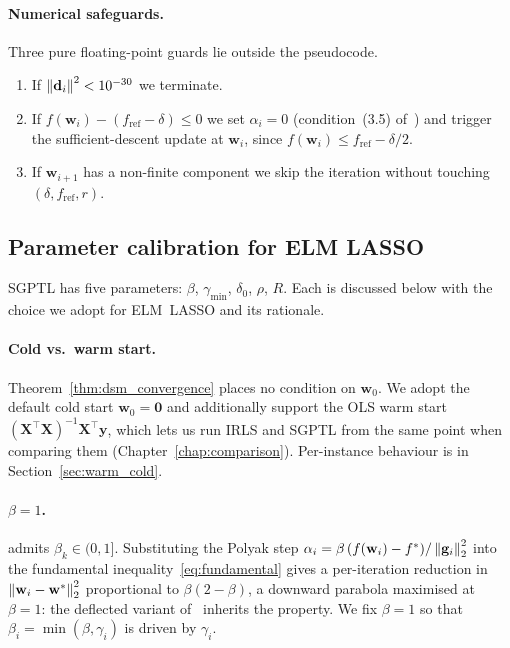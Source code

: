 \paragraph{Numerical safeguards.}
Three pure floating-point guards lie outside the pseudocode. 
\begin{enumerate}
  \item If $\left\lVert \mathbf{d}_i \right\rVert^2 < 10^{-30}$ we terminate.
  \item If $f(\mathbf{w}_i) - (f_{\mathrm{ref}}-\delta) \le 0$ we set $\alpha_i = 0$ (condition~(3.5) of~\cite{dantonio2009deflected}) and trigger the sufficient-descent update at $\mathbf{w}_i$, since $f(\mathbf{w}_i) \le f_{\mathrm{ref}}-\delta/2$.
  \item If $\mathbf{w}_{i+1}$ has a non-finite component we skip the iteration without touching $(\delta, f_{\mathrm{ref}}, r)$.
\end{enumerate}

\subsection{Parameter calibration for ELM LASSO}
\label{sec:dsm_parameters}

SGPTL has five parameters: $\beta$, $\gamma_{\min}$, $\delta_0$, $\rho$, $R$. Each is discussed below with the choice we adopt for ELM~LASSO and its rationale. 

\paragraph{Cold vs.\ warm start.}
Theorem~\ref{thm:dsm_convergence} places no condition on $\mathbf{w}_0$. We adopt the default cold start $\mathbf{w}_0 = \mathbf{0}$ and additionally support the OLS warm start $(\mathbf{X}^\top\mathbf{X})^{-1}\mathbf{X}^\top\mathbf{y}$, which lets us run IRLS and SGPTL from the same point when comparing them (Chapter~\ref{chap:comparison}). Per-instance behaviour is in Section~\ref{sec:warm_cold}.

\paragraph{$\beta = 1$.}
\cite[(3.1)]{dantonio2009deflected} admits $\beta_k \in (0, 1]$. Substituting the Polyak step $\alpha_i = \beta\,(f(\mathbf{w}_i)-f^*)/\left\lVert \mathbf{g}_i \right\rVert_2^2$ into the fundamental inequality~\eqref{eq:fundamental} gives a per-iteration reduction in $\left\lVert \mathbf{w}_i - \mathbf{w}^* \right\rVert_2^2$ proportional to $\beta(2 - \beta)$, a downward parabola maximised at $\beta = 1$: the deflected variant of~\cite[Slide 15]{frangioni-slides-nonsmooth} inherits the property. We fix $\beta = 1$ so that $\beta_i = \min(\beta, \gamma_i)$ is driven by $\gamma_i$.

